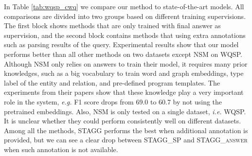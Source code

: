  In Table \ref{tab:wqsp_cwq} we compare our method to state-of-the-art models. All comparisons are divided into two groups based on different training supervisions. The first block shows methods that are only trained with final answer as supervision, and the second block contains methods that using extra annotations such as parsing results of the query. Experimental results show that our model performs better than all other methods on two datasets except NSM \cite{DBLP:conf/acl/LiangBLFL17} on WQSP. Although NSM only relies on answers to train their model, it requires many prior knowledges, such as a big vocabulary to train word and graph embeddings, type label of the entity and relation, and pre-defined program templates. The experiments from their papers show that these knowledge play a very important role in the system, \emph{e.g.} F1 score drops from 69.0 to 60.7 by not using the pretrained embeddings. %
 Also, NSM is only tested on a single dataset, \emph{i.e.} WQSP. It is unclear whether they could perform consistently well on different datasets. Among all the methods, \textsc{STAGG} performs the best when additional annotation is provided, but we can see a clear drop between \textsc{STAGG\_SP} and \textsc{STAGG\_answer} when such annotation is not available.



